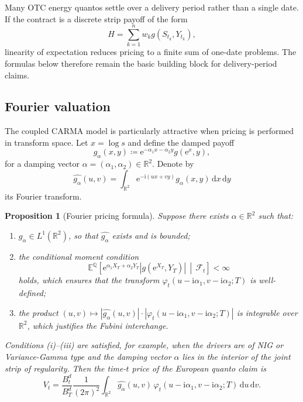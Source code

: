 \documentclass[10pt,a4paper,reqno]{amsart}
\newtheorem{proposition}[theorem]{Proposition}
\newcommand{\R}{\mathbb{R}}
\newcommand{\E}{\mathbb{E}}
\newcommand{\Q}{\mathbb{Q}}
\newcommand{\F}{\mathcal{F}}
\newcommand{\1}{\mathbbm{1}}
\newcommand{\dd}{\mathrm{d}}
\newcommand{\ii}{\mathrm{i}}
\newcommand{\ee}{\mathrm{e}}
\begin{document}
Many OTC energy quantos settle over a delivery period rather than a single date.
If the contract is a discrete strip payoff of the form
\[
H = \sum_{k=1}^n w_k g(S_{t_k},Y_{t_k}),
\]
linearity of expectation reduces pricing to a finite sum of one-date problems.
The formulas below therefore remain the basic building block for
delivery-period claims.

\subsection{Fourier valuation}

The coupled CARMA model is particularly attractive when pricing is performed in
transform space. Let \(x=\log s\) and define the damped payoff
\[
g_\alpha(x,y) \coloneqq \ee^{-\alpha_1 x-\alpha_2 y} g(\ee^x,y),
\]
for a damping vector \(\alpha=(\alpha_1,\alpha_2)\in\R^2\). Denote by
\[
\widehat{g_\alpha}(u,v)
= \int_{\R^2} \ee^{-\ii(ux+vy)} g_\alpha(x,y)\,\dd x\,\dd y
\]
its Fourier transform.

\begin{proposition}[Fourier pricing formula]
\label{prop:fourier_pricing}
Suppose there exists \(\alpha\in\R^2\) such that:
\begin{enumerate}[label=(\roman*)]
  \item \(g_\alpha \in L^1(\R^2)\), so that \(\widehat{g_\alpha}\) exists and
    is bounded;
  \item the conditional moment condition
    \[
    \E^\Q\!\left[
      \ee^{\alpha_1 X_T + \alpha_2 Y_T}
      \left|g(\ee^{X_T},Y_T)\right|
      \,\middle|\, \F_t
    \right] < \infty
    \]
    holds, which ensures that the transform \(\varphi_t(u-\ii\alpha_1,
    v-\ii\alpha_2;T)\) is well-defined;
  \item the product \((u,v) \mapsto
    |\widehat{g_\alpha}(u,v)|\cdot|\varphi_t(u-\ii\alpha_1,v-\ii\alpha_2;T)|\)
    is integrable over \(\R^2\), which justifies the Fubini interchange.
\end{enumerate}
Conditions (i)--(iii) are satisfied, for example, when the drivers are of
NIG or Variance-Gamma type and the damping vector \(\alpha\) lies in
the interior of the joint strip of regularity.
Then the time-\(t\) price of the European quanto claim is
\begin{equation}\label{eq:fourier_pricing}
  V_t
  = \frac{B_t^d}{B_T^d} \frac{1}{(2\pi)^2}
    \int_{\R^2}
      \widehat{g_\alpha}(u,v)\,
      \varphi_t(u-\ii\alpha_1,v-\ii\alpha_2;T)
      \,\dd u\,\dd v.
\end{equation}
\end{proposition}
\end{document}
